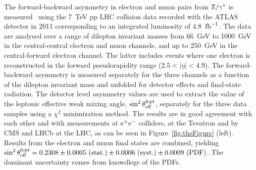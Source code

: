 \documentclass{blois}
\begin{document}
The forward-backward asymmetry in electron and muon pairs from ${\rm Z}/\gamma^*$
is measured~\cite{bib:ATLAS-fb-asymmetry} using the 7~TeV pp LHC collision data
recorded with the ATLAS~\cite{bib:ATLAS-detector} detector in 2011 corresponding to an integrated luminosity
of 4.8~${\rm fb}^{-1}$. The data are analysed over a range of dilepton invariant
masses from 66~GeV to 1000~GeV in the central-central electron and muon channels,
and up to 250~GeV in the central-forward electron channel. The latter includes
events where one electron is reconstructed in the forward pseudorapidity range
($2.5 < |\eta| < 4.9$). The forward-backward asymmetry is measured separately
for the three channels as a function of the dilepton invariant mass and unfolded
for detector effects and final-state radiation. The detector level asymmetry
values are used to extract the value of the leptonic effective weak mixing angle,
$\sin^2\theta_{\rm eff}^{\rm lept}$, separately for the three data samples using
a $\chi^2$ minimization method. The results are in good agreement with each other
and with measurements at ${\rm e}^+{\rm e}^-$ colliders, at the Tevatron and by
CMS and LHCb at the LHC, as can be seen in Figure~\ref{fig:theFigure} (left). Results
from the electron and muon final states are combined, yielding
$\sin^2\theta_{\rm eff}^{\rm lept} = 0.2308 \pm 0.0005~({\rm stat.}) \pm 0.0006~({\rm syst.}) \pm 0.0009~({\rm PDF})$.
The dominant uncertainty comes from knowdlege of the PDFs.
%
\end{document}

